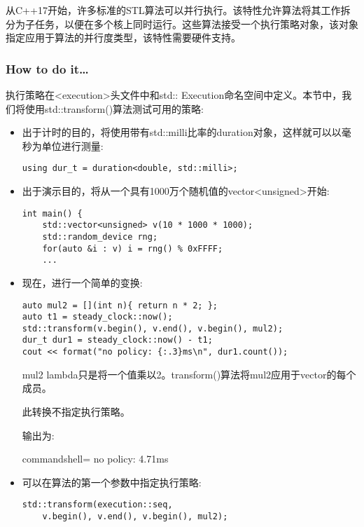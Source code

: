 
从C++17开始，许多标准的STL算法可以并行执行。该特性允许算法将其工作拆分为子任务，以便在多个核上同时运行。这些算法接受一个执行策略对象，该对象指定应用于算法的并行度类型，该特性需要硬件支持。

\subsubsection{How to do it…}

执行策略在<execution>头文件中和std:: Execution命名空间中定义。本节中，我们将使用std::transform()算法测试可用的策略:

\begin{itemize}
\item 
出于计时的目的，将使用带有std::milli比率的duration对象，这样就可以以毫秒为单位进行测量:

\begin{lstlisting}[style=styleCXX]
using dur_t = duration<double, std::milli>;
\end{lstlisting}

\item 
出于演示目的，将从一个具有1000万个随机值的vector<unsigned>开始:

\begin{lstlisting}[style=styleCXX]
int main() {
	std::vector<unsigned> v(10 * 1000 * 1000);
	std::random_device rng;
	for(auto &i : v) i = rng() % 0xFFFF;
	...
\end{lstlisting}

\item 
现在，进行一个简单的变换:

\begin{lstlisting}[style=styleCXX]
auto mul2 = [](int n){ return n * 2; };
auto t1 = steady_clock::now();
std::transform(v.begin(), v.end(), v.begin(), mul2);
dur_t dur1 = steady_clock::now() - t1;
cout << format("no policy: {:.3}ms\n", dur1.count());
\end{lstlisting}

mul2 lambda只是将一个值乘以2。transform()算法将mul2应用于vector的每个成员。

此转换不指定执行策略。

输出为:

\begin{tcblisting}{commandshell={}}
no policy: 4.71ms
\end{tcblisting}

\item 
可以在算法的第一个参数中指定执行策略:

\begin{lstlisting}[style=styleCXX]
std::transform(execution::seq,
	v.begin(), v.end(), v.begin(), mul2);
\end{lstlisting}


\end{itemize}
